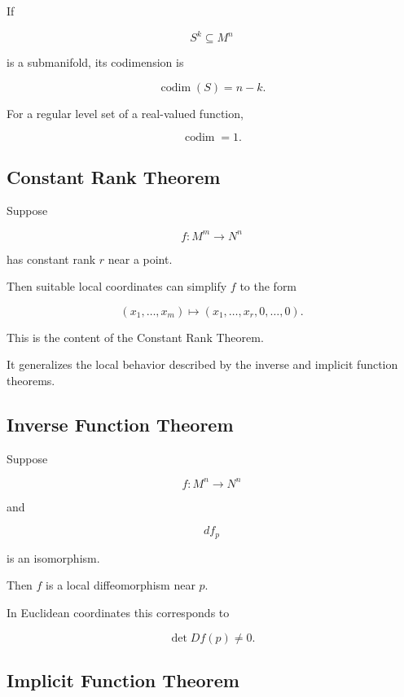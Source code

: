 If

\[
S^k\subseteq M^n
\]

is a submanifold, its codimension is

\[
\boxed{
\operatorname{codim}(S)
=
n-k.
}
\]

For a regular level set of a real-valued function,

\[
\boxed{
\operatorname{codim}=1.
}
\]

\subsection{Constant Rank Theorem}
\label{subsec:constant-rank-theorem}

Suppose

\[
f:M^m\to N^n
\]

has constant rank \(r\) near a point.

Then suitable local coordinates can simplify \(f\) to the form

\[
\boxed{
(x_1,\ldots,x_m)
\mapsto
(x_1,\ldots,x_r,0,\ldots,0).
}
\]

This is the content of the Constant Rank Theorem.

It generalizes the local behavior described by the inverse and implicit
function theorems.

\subsection{Inverse Function Theorem}
\label{subsec:differential-topology-inverse-function}

Suppose

\[
f:M^n\to N^n
\]

and

\[
df_p
\]

is an isomorphism.

Then \(f\) is a local diffeomorphism near \(p\).

In Euclidean coordinates this corresponds to

\[
\boxed{
\det Df(p)\neq0.
}
\]

\subsection{Implicit Function Theorem}
\label{subsec:differential-topology-implicit-function}

